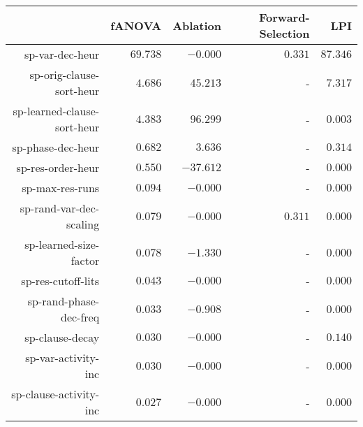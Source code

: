\begin{table}
\begin{tabular}{r|r|r|r|r}
\toprule
                                                            &      fANOVA       &     Ablation      & Forward-Selection &        LPI       \\
\hline
sp-var-dec-heur                                             & $         69.738$ & $         -0.000$ & $          0.331$ & $         87.346$\\
sp-orig-clause-sort-heur                                    & $          4.686$ & $         45.213$ &                 - & $          7.317$\\
sp-learned-clause-sort-heur                                 & $          4.383$ & $         96.299$ &                 - & $          0.003$\\
sp-phase-dec-heur                                           & $          0.682$ & $          3.636$ &                 - & $          0.314$\\
sp-res-order-heur                                           & $          0.550$ & $        -37.612$ &                 - & $          0.000$\\
sp-max-res-runs                                             & $          0.094$ & $         -0.000$ &                 - & $          0.000$\\
sp-rand-var-dec-scaling                                     & $          0.079$ & $         -0.000$ & $          0.311$ & $          0.000$\\
sp-learned-size-factor                                      & $          0.078$ & $         -1.330$ &                 - & $          0.000$\\
sp-res-cutoff-lits                                          & $          0.043$ & $         -0.000$ &                 - & $          0.000$\\
sp-rand-phase-dec-freq                                      & $          0.033$ & $         -0.908$ &                 - & $          0.000$\\
sp-clause-decay                                             & $          0.030$ & $         -0.000$ &                 - & $          0.140$\\
sp-var-activity-inc                                         & $          0.030$ & $         -0.000$ &                 - & $          0.000$\\
sp-clause-activity-inc                                      & $          0.027$ & $         -0.000$ &                 - & $          0.000$\\

\end{tabular}
\end{table}
